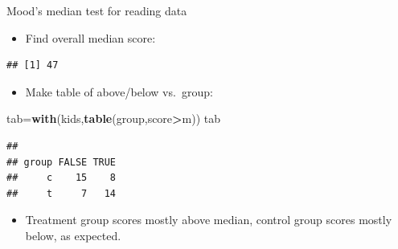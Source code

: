 \documentclass[ignorenonframetext,]{beamer}
\newenvironment{Shaded}{\begin{snugshade}}{\end{snugshade}}
\newcommand{\DataTypeTok}[1]{\textcolor[rgb]{0.13,0.29,0.53}{#1}}
\newcommand{\KeywordTok}[1]{\textcolor[rgb]{0.13,0.29,0.53}{\textbf{#1}}}
\newcommand{\NormalTok}[1]{#1}
\newcommand{\OperatorTok}[1]{\textcolor[rgb]{0.81,0.36,0.00}{\textbf{#1}}}
\newcommand{\StringTok}[1]{\textcolor[rgb]{0.31,0.60,0.02}{#1}}
\providecommand{\tightlist}{%
  \setlength{\itemsep}{0pt}\setlength{\parskip}{0pt}}
\begin{document}
\begin{frame}[fragile]{Mood's median test for reading data}
\protect\hypertarget{moods-median-test-for-reading-data}{}

\begin{itemize}
\tightlist
\item
  Find overall median score:
\end{itemize}

\begin{Shaded}
\end{Shaded}

\begin{verbatim}
## [1] 47
\end{verbatim}

\begin{itemize}
\tightlist
\item
  Make table of above/below vs.~group:
\end{itemize}

\begin{Shaded}
\begin{Highlighting}[]
\NormalTok{tab=}\KeywordTok{with}\NormalTok{(kids,}\KeywordTok{table}\NormalTok{(group,score}\OperatorTok{>}\NormalTok{m))}
\NormalTok{tab}
\end{Highlighting}
\end{Shaded}

\begin{verbatim}
##      
## group FALSE TRUE
##     c    15    8
##     t     7   14
\end{verbatim}

\begin{itemize}
\tightlist
\item
  Treatment group scores mostly above median, control group scores
  mostly below, as expected.
\end{itemize}

\end{frame}
\end{document}

